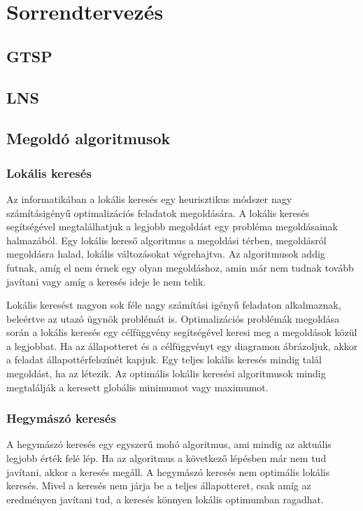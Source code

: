 \section{Sorrendtervezés}
\subsection{GTSP}
\subsection{LNS}
\subsection{Megoldó algoritmusok}
\subsubsection{Lokális keresés}

Az informatikában a lokális keresés egy heurisztikus módszer nagy számításigényű optimalizációs feladatok megoldására. A lokális keresés segítségével megtalálhatjuk a legjobb megoldást egy probléma megoldásainak halmazából. Egy lokális kereső algoritmus a megoldási térben, megoldásról megoldásra halad, lokális változásokat végrehajtva. Az algoritmusok addig futnak, amíg el nem érnek egy olyan megoldáshoz, amin már nem tudnak tovább javítani vagy amíg a keresés ideje le nem telik.

Lokális keresést nagyon sok féle nagy számítási igényű feladaton alkalmaznak, beleértve az utazó ügynök problémát is.
Optimalizációs problémák megoldása során a lokális keresés egy célfüggvény segítségével keresi meg a megoldások közül a legjobbat. Ha az állapotteret és a célfüggvényt egy diagramon ábrázoljuk, akkor a feladat állapottérfelszínét kapjuk. Egy teljes lokális keresés mindig talál megoldást, ha az létezik. Az optimális lokális keresési algoritmusok mindig megtalálják a keresett globális minimumot vagy maximumot.


\subsubsection{Hegymászó keresés}

A hegymászó keresés egy egyszerű mohó algoritmus, ami mindig az aktuális legjobb érték felé lép. Ha az algoritmus a következő lépésben már nem tud javítani, akkor a keresés megáll. A hegymászó keresés nem optimális lokális keresés. Mivel a keresés nem járja be a teljes állapotteret, csak amíg az eredményen javítani tud, a keresés könnyen lokális optimumban ragadhat.

